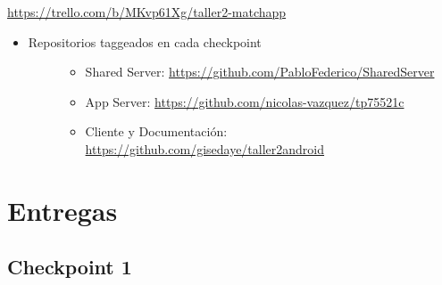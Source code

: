 \documentclass[letterpaper,10pt,english]{sphinxmanual}
\begin{document}
\href{https://trello.com/b/MKvp61Xg/taller2-matchapp}{https://trello.com/b/MKvp61Xg/taller2-matchapp}
\begin{itemize}
\item {} \begin{description}
\item[{Repositorios taggeados en cada checkpoint}] \leavevmode\begin{itemize}
\item {} 
Shared Server: \href{https://github.com/PabloFederico/SharedServer}{https://github.com/PabloFederico/SharedServer}

\item {} 
App Server: \href{https://github.com/nicolas-vazquez/tp75521c}{https://github.com/nicolas-vazquez/tp75521c}

\item {} 
Cliente y Documentación: \href{https://github.com/gisedaye/taller2android}{https://github.com/gisedaye/taller2android}

\end{itemize}

\end{description}

\end{itemize}


\section{Entregas}
\label{manuals:entregas}

\subsection{Checkpoint 1}
\label{manuals:checkpoint-1}
\end{document}

